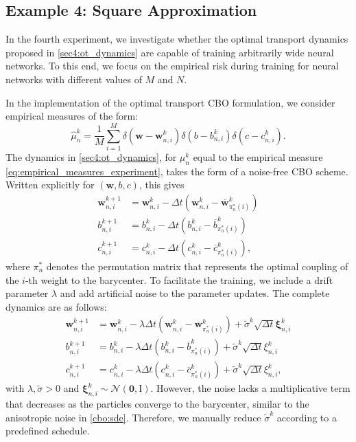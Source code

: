 \documentclass[a4paper, 11pt]{article}
\newcommand{\hmu}{\hat{\mu}_{n}}
\theoremstyle{plain} %
\begin{document}
	\subsection{Example 4: Square Approximation}\label{sec:mean-field_numerics}
	In the fourth experiment, we investigate whether the optimal transport dynamics proposed in \eqref{sec4:ot_dynamics} are capable of training arbitrarily wide neural networks. To this end, we focus on the empirical risk during training for neural networks with different values of $ M $ and $N$.

	In the implementation of the optimal transport CBO formulation, we consider empirical measures of the form:
	\begin{equation}\label{eq:empirical_measures_experiment}
		\hmu^{k} = \frac{1}{M} \sum_{i=1}^{M} \delta(\bm{w} - \bm{w}_{n,i}^{k})\delta(b - b_{n,i}^{k})\delta(c - c_{n,i}^{k}).
	\end{equation} 
	The dynamics in \eqref{sec4:ot_dynamics}, for $ \mu_n^k $ equal to the empirical measure \eqref{eq:empirical_measures_experiment}, takes the form of a noise-free CBO scheme. Written explicitly for $ (\bm{w}, b,c) $, this gives 	
	\begin{align}
		\bm{w}^{k+1}_{n,i} &= \bm{w}_{n,i}^{k} - \Delta t \left(\bm{w}^{k}_{n, i} - \overline{\bm{w}}^{k}_{\pi^{*}_{n}(i)}\right)\\
		b^{k+1}_{n,i} &= b_{n,i}^{k} - \Delta t \left(b^{k}_{n, i} - \overline{b}^{k}_{\pi^{*}_{n}(i)}\right)\\ 
		c^{k+1}_{n,i} &= c_{n,i}^{k} - \Delta t \left(c^{k}_{n, i} - \overline{c}^{k}_{\pi^{*}_{n}(i)}\right),
	\end{align}
	where $ \pi^*_{n} $ denotes the permutation matrix that represents the optimal coupling of the $ i $-th weight to the barycenter. To facilitate the training, we include a drift parameter $ \lambda $ and add artificial noise to the parameter updates. The complete dynamics are as follows:
		\begin{align}
		\bm{w}^{k+1}_{n,i} &= \bm{w}_{n,i}^{k} - \lambda \Delta t \left(\bm{w}^{k}_{n, i} - \overline{\bm{w}}^{k}_{\pi^{*}_{n}(i)}\right) + \tilde{\sigma}^{k}\sqrt{\Delta t}\bm{\xi}_{n,i}^{k}\label{eq:OT_discrete_w} \\
		b^{k+1}_{n,i} &= b_{n,i}^{k} - \lambda \Delta t \left(b^{k}_{n, i} - \overline{b}^{k}_{\pi^{*}_{n}(i)}\right) + \tilde{\sigma}^{k}\sqrt{\Delta t}\xi_{n,i}^{k} \label{eq:OT_discrete_b} \\ 
		c^{k+1}_{n,i} &= c_{n,i}^{k} - \lambda \Delta t \left(c^{k}_{n, i} - \overline{c}^{k}_{\pi^{*}_{n}(i)}\right) + \tilde{\sigma}^{k}\sqrt{\Delta t}\xi_{n,i}^{k}, \label{eq:OT_discrete_c}
	\end{align}
	with $ \lambda, \tilde{\sigma} > 0$ and $\bm{\xi}_{n,i}^{k} \sim \mathcal{N}\left(\bm{0}, \bm{\mathrm{I}} \right) $. However, the noise lacks a multiplicative term that decreases as the particles converge to the barycenter, similar to the anisotropic noise in \eqref{cbo:sde}. Therefore, we manually reduce $ \tilde{\sigma}^{k} $ according to a predefined schedule.
\end{document}
